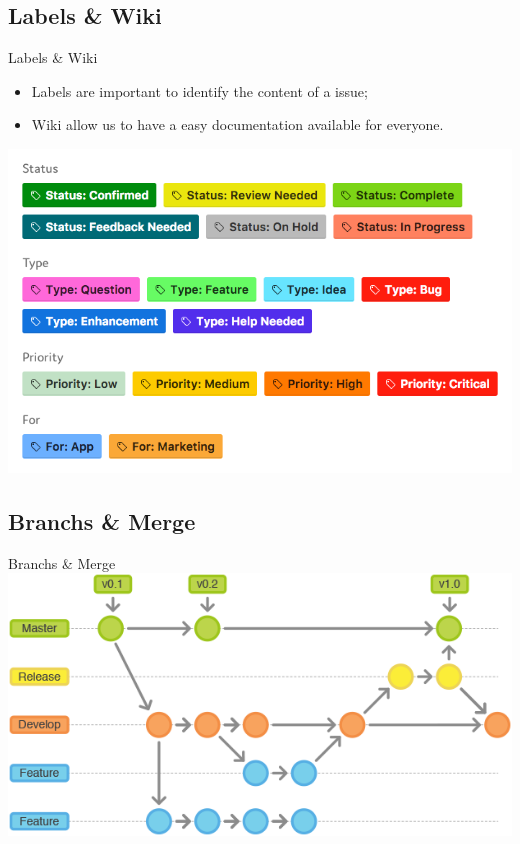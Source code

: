 \subsection{Labels \& Wiki}
\begin{frame}{Labels \& Wiki}
    \begin{itemize}
        \item Labels are important to identify the content of a issue;
        \item Wiki allow us to have a easy documentation available for everyone.
    \end{itemize}
    \centering
    \includegraphics[scale=.3]{github_labels}
\end{frame}

\subsection {Branchs \& Merge}
\begin{frame}{Branchs \& Merge}
    \centering
    \includegraphics[scale=.5]{github_branch_merge}
    
\end{frame}

